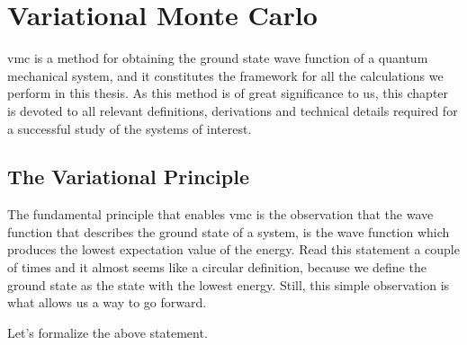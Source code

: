 \documentclass[Thesis.tex]{subfiles}
\begin{document}
\chapter{Variational Monte Carlo}
\label{chp:variational-monte-carlo}


\Gls{vmc} is a method for obtaining the ground state wave function of
a quantum mechanical system, and it constitutes the framework for all the calculations we
perform in this thesis. As this method is of great significance to us, this chapter is
devoted to all relevant definitions, derivations and technical details required for a
successful study of the systems of interest.

\section{The Variational Principle}

The fundamental principle that enables \gls{vmc} is the observation that the wave function that
describes the ground state of a system, is the wave function which produces the lowest
expectation value of the energy. Read this statement a couple of times and it almost seems
like a circular definition, because we define the ground state as the state with the
lowest energy. Still, this simple observation is what allows us a way to go forward.

Let's formalize the above statement.
\end{document}
